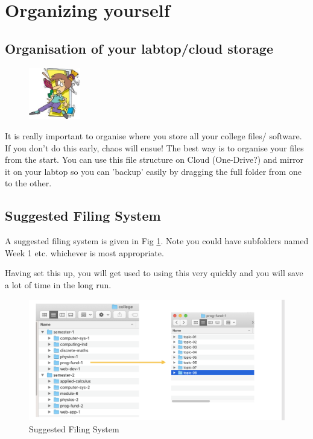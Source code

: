 \documentclass{article}
\begin{document}
 \section{Organizing yourself}
 \subsection{Organisation of your labtop/cloud storage}

\begin{figure} %
    \centering
    \includegraphics[width=0.2\textwidth]{img/chaos.jpg}
\end{figure}

It is really important to organise where you store all your college files/ software.
If you don’t do this early, chaos will ensue! The best way is to organise your files from the start. 
You can use this file structure on Cloud (One-Drive?) and mirror it on your labtop so you can 'backup' easily by dragging the full folder from one to the other. 
  
\subsection{Suggested Filing System}

A suggested filing system is given in Fig \ref{filing}. Note you could have subfolders named Week 1 etc. whichever is most appropriate. 

Having set this up, you will get used to using this very quickly and you will save a lot of time in the long run. 
\begin{figure}[h]
\centering
\includegraphics[width=.6\textwidth]{img/filing.png}
\caption{Suggested Filing System}
\label{filing}
\end{figure}
\end{document}
